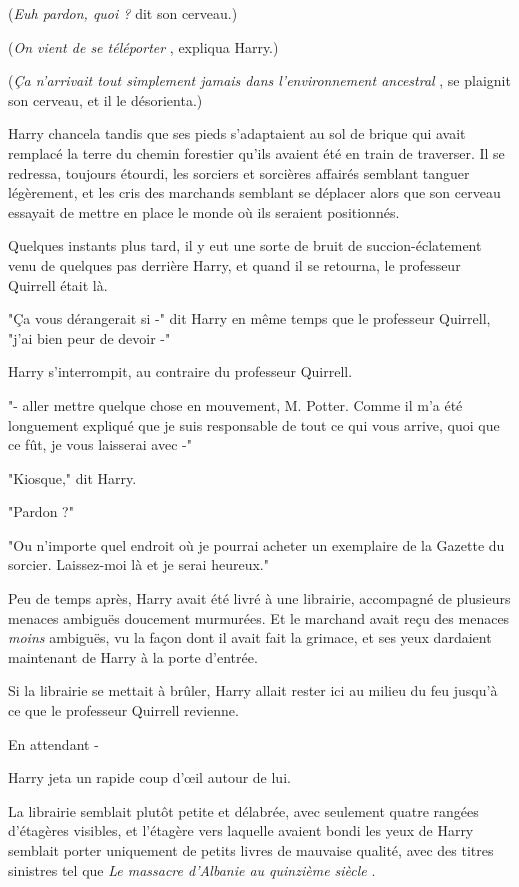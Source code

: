 (\emph{Euh pardon, quoi ?}  dit son cerveau.)

(\emph{On vient de se téléporter} , expliqua Harry.)

(\emph{Ça n'arrivait tout simplement jamais dans l'environnement ancestral} , se plaignit son cerveau, et il le désorienta.)

Harry chancela tandis que ses pieds s'adaptaient au sol de brique qui avait remplacé la terre du chemin forestier qu'ils avaient été en train de traverser. Il se redressa, toujours étourdi, les sorciers et sorcières affairés semblant tanguer légèrement, et les cris des marchands semblant se déplacer alors que son cerveau essayait de mettre en place le monde où ils seraient positionnés.

Quelques instants plus tard, il y eut une sorte de bruit de succion-éclatement venu de quelques pas derrière Harry, et quand il se retourna, le professeur Quirrell était là.

"Ça vous dérangerait si -" dit Harry en même temps que le professeur Quirrell, "j'ai bien peur de devoir -"

Harry s'interrompit, au contraire du professeur Quirrell.

"- aller mettre quelque chose en mouvement, M. Potter. Comme il m'a été longuement expliqué que je suis responsable de tout ce qui vous arrive, quoi que ce fût, je vous laisserai avec -"

"Kiosque," dit Harry.

"Pardon ?"

"Ou n'importe quel endroit où je pourrai acheter un exemplaire de la Gazette du sorcier. Laissez-moi là et je serai heureux."

Peu de temps après, Harry avait été livré à une librairie, accompagné de plusieurs menaces ambiguës doucement murmurées. Et le marchand avait reçu des menaces \emph{moins}  ambiguës, vu la façon dont il avait fait la grimace, et ses yeux dardaient maintenant de Harry à la porte d'entrée.

Si la librairie se mettait à brûler, Harry allait rester ici au milieu du feu jusqu'à ce que le professeur Quirrell revienne.

En attendant -

Harry jeta un rapide coup d'œil autour de lui.

La librairie semblait plutôt petite et délabrée, avec seulement quatre rangées d'étagères visibles, et l'étagère vers laquelle avaient bondi les yeux de Harry semblait porter uniquement de petits livres de mauvaise qualité, avec des titres sinistres tel que \emph{Le massacre d'Albanie au quinzième siècle} .

